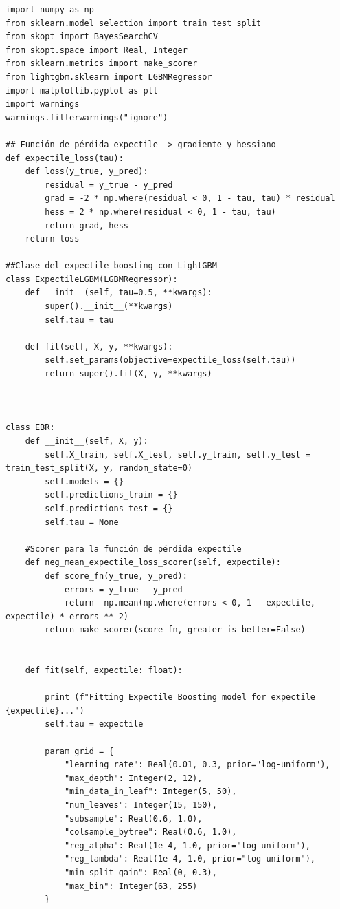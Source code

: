 \documentclass[11pt]{book}
\theoremstyle{plain} %
\theoremstyle{definition} %
\begin{document}
 \begin{lstlisting}[style=pythonstyle, caption=expectileboosting.py]
   import numpy as np
from sklearn.model_selection import train_test_split
from skopt import BayesSearchCV
from skopt.space import Real, Integer
from sklearn.metrics import make_scorer
from lightgbm.sklearn import LGBMRegressor
import matplotlib.pyplot as plt
import warnings
warnings.filterwarnings("ignore")

## Función de pérdida expectile -> gradiente y hessiano
def expectile_loss(tau):
    def loss(y_true, y_pred):
        residual = y_true - y_pred
        grad = -2 * np.where(residual < 0, 1 - tau, tau) * residual
        hess = 2 * np.where(residual < 0, 1 - tau, tau)
        return grad, hess
    return loss

##Clase del expectile boosting con LightGBM
class ExpectileLGBM(LGBMRegressor):
    def __init__(self, tau=0.5, **kwargs):
        super().__init__(**kwargs)
        self.tau = tau
    
    def fit(self, X, y, **kwargs):
        self.set_params(objective=expectile_loss(self.tau))
        return super().fit(X, y, **kwargs)



class EBR:
    def __init__(self, X, y):
        self.X_train, self.X_test, self.y_train, self.y_test = train_test_split(X, y, random_state=0)
        self.models = {}
        self.predictions_train = {}
        self.predictions_test = {}
        self.tau = None

    #Scorer para la función de pérdida expectile
    def neg_mean_expectile_loss_scorer(self, expectile):
        def score_fn(y_true, y_pred):
            errors = y_true - y_pred
            return -np.mean(np.where(errors < 0, 1 - expectile, expectile) * errors ** 2)
        return make_scorer(score_fn, greater_is_better=False)
    

    def fit(self, expectile: float):

        print (f"Fitting Expectile Boosting model for expectile {expectile}...")
        self.tau = expectile

        param_grid = {
            "learning_rate": Real(0.01, 0.3, prior="log-uniform"),
            "max_depth": Integer(2, 12),
            "min_data_in_leaf": Integer(5, 50),
            "num_leaves": Integer(15, 150),
            "subsample": Real(0.6, 1.0),
            "colsample_bytree": Real(0.6, 1.0),
            "reg_alpha": Real(1e-4, 1.0, prior="log-uniform"),
            "reg_lambda": Real(1e-4, 1.0, prior="log-uniform"),
            "min_split_gain": Real(0, 0.3),
            "max_bin": Integer(63, 255)
        }



\end{lstlisting}
\end{document}
